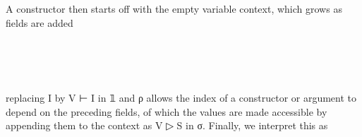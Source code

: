 A constructor then starts off with the empty variable context, which grows as fields are added
\begin{code}%
%
\>[2]\AgdaSpace{}%
\AgdaSpace{}%
\AgdaSpace{}%
\AgdaSpace{}%
\AgdaSpace{}%
\<%
\\
\>[2][@{}l@{\AgdaIndent{0}}]%
\>[4]%
\>[8]\AgdaSymbol{:}\AgdaSpace{}%
\AgdaSpace{}%
\AgdaSpace{}%
\AgdaSpace{}%
\AgdaSpace{}%
\AgdaSpace{}%
\AgdaSpace{}%
\AgdaSpace{}%
\<%
\\
%
\>[4]%
\>[8]\AgdaSymbol{:}\AgdaSpace{}%
\AgdaSpace{}%
\AgdaSpace{}%
\AgdaSpace{}%
\AgdaSpace{}%
\AgdaSpace{}%
\AgdaSpace{}%
\AgdaSpace{}%
\AgdaSpace{}%
\AgdaSpace{}%
\AgdaSpace{}%
\AgdaSpace{}%
\AgdaSpace{}%
\<%
\\
%
\>[4]%
\>[8]\AgdaSymbol{:}\AgdaSpace{}%
\AgdaSymbol{(}\AgdaSpace{}%
\AgdaSymbol{:}\AgdaSpace{}%
\AgdaSpace{}%
\AgdaSpace{}%
\AgdaSymbol{)}\AgdaSpace{}%
\AgdaSpace{}%
\AgdaSpace{}%
\AgdaSpace{}%
\AgdaSymbol{(}\AgdaSpace{}%
\AgdaSpace{}%
\AgdaSymbol{)}\AgdaSpace{}%
\AgdaSpace{}%
\AgdaSpace{}%
\AgdaSpace{}%
\AgdaSpace{}%
\AgdaSpace{}%
\<%
\end{code}
replacing I by V ⊢ I in 𝟙 and ρ allows the index of a constructor or argument to depend on the preceding fields, of which the values are made accessible by appending them to the context as V ▷ S in σ. Finally, we interpret this as
